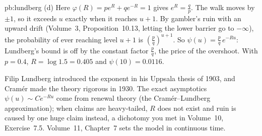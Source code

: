 \begin{solution}{pb:lundberg}
(d) Here $\varphi(R)=pe^R+qe^{-R}=1$ gives $e^R=\frac qp$. The walk moves by $\pm1$, so it exceeds $u$ exactly when it reaches $u+1$. By gambler's ruin with an upward
drift (Volume~3, Proposition~10.13, letting the lower barrier go to $-\infty$), the probability of ever reaching level $u+1$ is $(\frac pq)^{u+1}$. So
$\psi(u)=\frac pq\,e^{-Ru}$: Lundberg's bound is off by the constant factor $\frac pq$, the price of the overshoot. With $p=0.4$, $R=\log1.5=0.405$ and $\psi(10)=0.0116$.

\leads Filip Lundberg introduced the exponent in his Uppsala thesis of 1903, and Cram\'er made the theory rigorous in 1930. The exact asymptotics $\psi(u)\sim Ce^{-Ru}$ come from
renewal theory (the Cram\'er--Lundberg approximation); when claims are heavy-tailed, $R$ does not exist and ruin is caused by one huge claim instead, a dichotomy you met
in Volume~10, Exercise~7.5. Volume~11, Chapter~7 sets the model in continuous time.
\end{solution}

